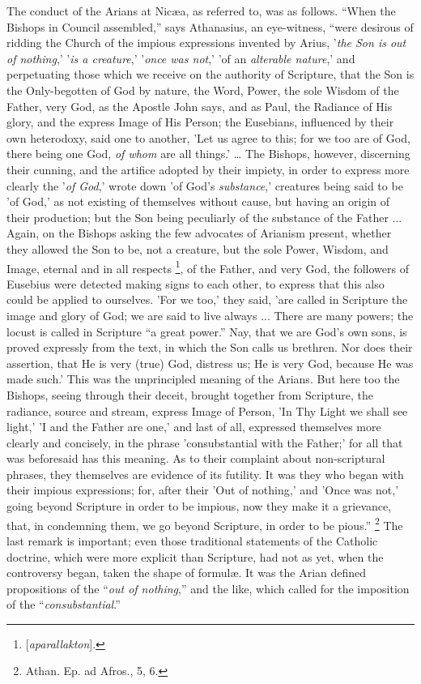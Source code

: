 The conduct of the Arians at Nicæa, as referred to, was as
follows. ``When the Bishops in Council assembled,'' says
Athanasius, an eye-witness, ``were desirous of ridding the Church
of the impious expressions invented by Arius, '\emph{the Son is out of
nothing},' '\emph{is a creature},' '\emph{once was not},' 'of an \emph{alterable
nature},' and perpetuating those which we receive on the authority
of Scripture, that the Son is the Only-begotten of God by nature, the
Word, Power, the sole Wisdom of the Father, very God, as the Apostle
John says, and as Paul, the Radiance of His glory, and the express
Image of His Person; the Eusebians, influenced by their own
heterodoxy, said one to another, 'Let us agree to this; for we too are
of God, there being one God, \emph{of whom} are all things.' … The
Bishops, however, discerning their cunning, and the artifice adopted
by their impiety, in order to express more clearly the '\emph{of God},'
wrote down 'of God's \emph{substance},' creatures being said to be 'of
God,' as not existing of themselves without cause, but having an
origin of their production; but the Son being peculiarly of the
substance of the Father ... Again, on the Bishops asking the few
advocates of Arianism present, whether they allowed the Son to be, not
a creature, but the sole Power, Wisdom, and Image, eternal and
in all respects \footnote{[\emph{aparallakton}].}, of
the Father, and very God, the followers of Eusebius were detected
making signs to each other, to express that this also could be applied
to ourselves. 'For we too,' they said, 'are called in Scripture the
image and glory of God; we are said to live always ... There are many
powers; the locust is called in Scripture ``a great power.''
Nay, that we are God's own sons, is proved expressly from the text, in
which the Son calls us brethren. Nor does their assertion, that He is
very (true) God, distress us; He is very God, because He was made
such.' This was the unprincipled meaning of the Arians. But here too
the Bishops, seeing through their deceit, brought together from
Scripture, the radiance, source and stream, express Image of Person,
'In Thy Light we shall see light,' 'I and the Father are one,' and
last of all, expressed themselves more clearly and concisely, in the
phrase 'consubstantial with the Father;' for all that was beforesaid
has this meaning. As to their complaint about non-scriptural phrases,
they themselves are evidence of its futility. It was they who began
with their impious expressions; for, after their 'Out of nothing,' and
'Once was not,' going beyond Scripture in order to be impious, now
they make it a grievance, that, in condemning them, we go beyond
Scripture, in order to be pious.'' \footnote{Athan. Ep. ad Afros., 5, 6.} The last remark is important; even those traditional
statements of the Catholic doctrine, which were more explicit than
Scripture, had not as yet, when the controversy began, taken the shape
of formulæ. It was the Arian defined propositions of the ``\emph{out
of nothing},'' and the like, which called for the
imposition of the ``\emph{consubstantial}.''

